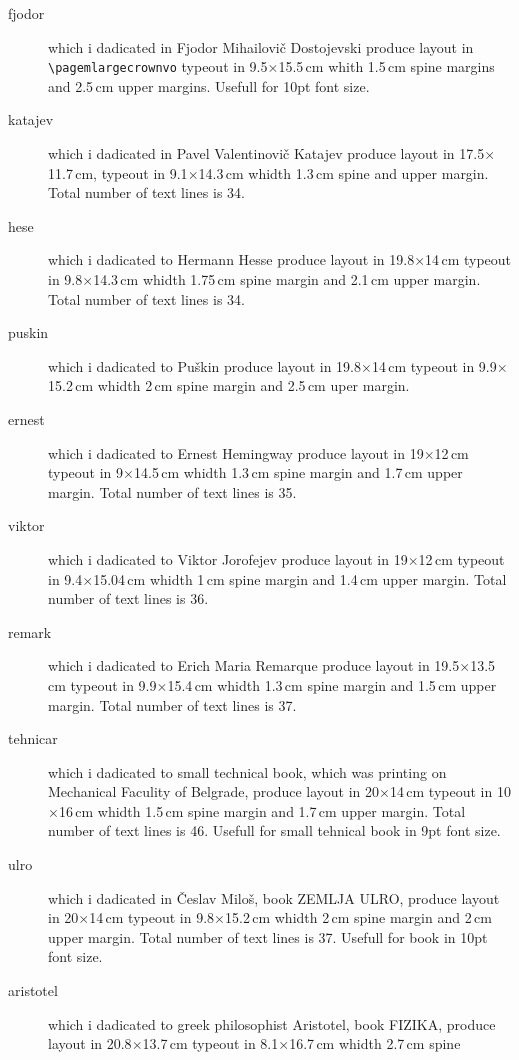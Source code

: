 \documentclass[a4paper,12pt]{article}
\begin{document}
\begin{description}
\item[fjodor] which i dadicated in Fjodor Mihailovi\v{c} Dostojevski produce layout in \verb|\pagemlargecrownvo| typeout in 9.5$\times$15.5\,cm whith 1.5\,cm spine margins 
and 2.5\,cm upper margins. Usefull for 10pt font size.
\item[katajev] which i dadicated in Pavel Valentinovi\v{c} Katajev produce layout in
17.5$\times$11.7\,cm, typeout in 9.1$\times$14.3\,cm whidth 1.3\,cm spine and upper margin. 
Total number of text lines is 34.
\item[hese] which i dadicated to Hermann Hesse produce layout in 19.8$\times$14\,cm
typeout in 9.8$\times$14.3\,cm whidth 1.75\,cm spine margin and 2.1\,cm upper margin.
Total number of text lines is 34.
\item[puskin] which i dadicated to Pu\v{s}kin produce layout in 19.8$\times$14\,cm
typeout in 9.9$\times$15.2\,cm whidth 2\,cm spine margin and 2.5\,cm uper margin.
\item[ernest] which i dadicated to Ernest Hemingway produce layout in 19$\times$12\,cm
typeout in 9$\times$14.5\,cm whidth 1.3\,cm spine margin and 1.7\,cm upper margin.
Total number of text lines is 35.
\item[viktor] which i dadicated to Viktor Jorofejev produce layout in 19$\times$12\,cm
typeout in 9.4$\times$15.04\,cm whidth 1\,cm spine margin and 1.4\,cm upper margin.
Total number of text lines is 36.
\item[remark] which i dadicated to Erich Maria Remarque produce layout in 19.5$\times$13.5\,cm
typeout in 9.9$\times$15.4\,cm whidth 1.3\,cm spine margin and 1.5\,cm upper margin.
Total number of text lines is 37.
\item[tehnicar] which i dadicated to small technical book, which was printing on Mechanical Faculity of Belgrade, produce layout in 20$\times$14\,cm
typeout in 10$\times$16\,cm whidth 1.5\,cm spine margin and 1.7\,cm upper margin.
Total number of text lines is 46. Usefull for small tehnical book in 9pt font size.
\item[ulro] which i dadicated in \v{C}eslav Milo\v{s}, book ZEMLJA ULRO, 
produce layout in 20$\times$14\,cm typeout in 9.8$\times$15.2\,cm whidth 2\,cm spine 
margin and 2\,cm upper margin. Total number of text lines is 37. Usefull for book in 10pt 
font size.
\item[aristotel] which i dadicated to greek philosophist Aristotel, book FIZIKA, 
produce layout in 20.8$\times$13.7\,cm typeout in 8.1$\times$16.7\,cm whidth 2.7\,cm spine 

\end{description}
\end{document}
